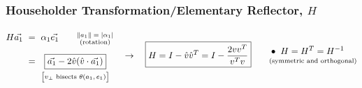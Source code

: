 \documentclass[12pt]{article}
\begin{document}
\newpage
\subsubsection{Householder Transformation/Elementary Reflector, \(H\)}
\[
	\begin{aligned}
		H\vec{a_1} &\ =\ \alpha_1 \vec{e_1} 
			\hspace{20pt} \begin{gathered}
				\text{\scriptsize\( \Vert a_1 \Vert = \vert \alpha_1 \vert \)}\\[-7pt]
				\text{\scriptsize(rotation)}
			\end{gathered}\\[5pt]
		&\ =\ \begin{gathered}[t]
				\boxed{ \vec{a_1} - 2\hat{v} (\hat{v} \cdot \vec{a_1}) }\\[-1pt]
				\text{\scriptsize\(\big[ v_\perp \text{ bisects } \theta(a_1, e_1) \big]\)}
			\end{gathered}
	\end{aligned}
	\ \ \ \rightarrow \ \ \
	\boxed{ H = I - \hat{v} \hat{v}^T = I - \frac{2vv^T}{v^Tv} }
	\hspace{20pt}
	\begin{aligned}
		&\bullet\ H = H^T = H^{-1}\\[-5pt]
		&\text{\scriptsize(symmetric and orthogonal)}
	\end{aligned}
\]
\end{document}
